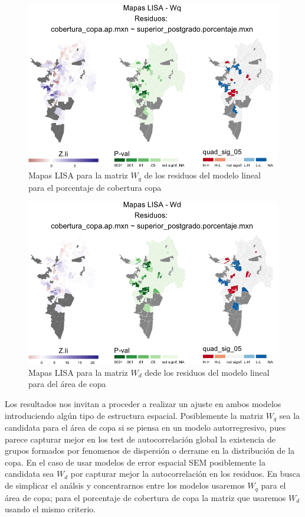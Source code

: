 \documentclass[12pt,]{book}
\begin{document}
\begin{figure}
\includegraphics[width=1\linewidth]{tesis-unigis_files/figure-latex/mapas-lisa-rescopaap-wq-1} \caption{Mapas LISA para la matriz $W_q$ de los residuos del modelo lineal para el porcentaje de cobertura copa}\label{fig:mapas-lisa-rescopaap-wq}
\end{figure}

\begin{figure}
\includegraphics[width=1\linewidth]{tesis-unigis_files/figure-latex/mapas-lisa-rescopaap-wd-1} \caption{Mapas LISA para la matriz $W_d$ dede los residuos del modelo lineal para del área de copa}\label{fig:mapas-lisa-rescopaap-wd}
\end{figure}

Los resultados nos invitan a proceder a realizar un ajuste en ambos
modelos introduciendo algún tipo de estructura espacial. Posiblemente la
matriz \(W_q\) sea la candidata para el área de copa si se piensa en un
modelo autorregresivo, pues parece capturar mejor en los test de
autocorrelación global la existencia de grupos formados por fenomenos de
dispersión o derrame en la distribución de la copa. En el caso de usar
modelos de error espacial SEM posiblemente la candidata sea \(W_d\) por
capturar mejor la autocorrelación en los residuos. En busca de simplicar
el análsis y concentrarnos entre los modelos usaremos \(W_q\) para el
área de copa; para el porcentaje de cobertura de copa la matriz que
usaremos \(W_d\) usando el mismo criterio.
\end{document}

